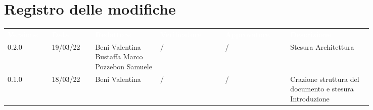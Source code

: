 \section*{Registro delle modifiche}

{\renewcommand{\arraystretch}{1.5}
\scriptsize
\begin{tabular}{p{0.10\linewidth}p{0.10\linewidth}p{0.15\linewidth}p{0.15\linewidth}p{0.15\linewidth}p{0.19\linewidth}}
	\rowcolor[RGB]{33, 73, 50}
	\textcolor{white}{\textbf{Versione}} & \textcolor{white}{\textbf{Data}} &
	\textcolor{white}{\textbf{Redattore}} & \textcolor{white}{\textbf{Verificatore}} &
	\textcolor{white}{\textbf{Approvatore}} & \textcolor{white}{\textbf{Descrizione}}\\
	\rowcolor[RGB]{233, 245, 206}
	0.2.0 & 19/03/22 & Beni Valentina Bustaffa Marco Pozzebon Samuele & / & / & Stesura Architettura\\
	\rowcolor[RGB]{216, 235, 171}
	0.1.0 & 18/03/22 & Beni Valentina & / & / & Crazione struttura del documento e stesura Introduzione\\	
\end{tabular}	
}